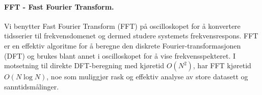 \paragraph{FFT - Fast Fourier Transform.}
Vi benytter Fast Fourier Transform (FFT) på oscilloskopet for å konvertere tidsserier til frekvensdomenet og dermed studere systemets frekvensrespons. FFT er en effektiv algoritme for å beregne den diskrete Fourier-transformasjonen (DFT) og brukes blant annet i oscilloskopet for å vise frekvensspekteret. I motsetning til direkte DFT-beregning med kjøretid $O(N^2)$, har FFT kjøretid $O(N\log N)$, noe som muliggjør rask og effektiv analyse av store datasett og sanntidsmålinger.
